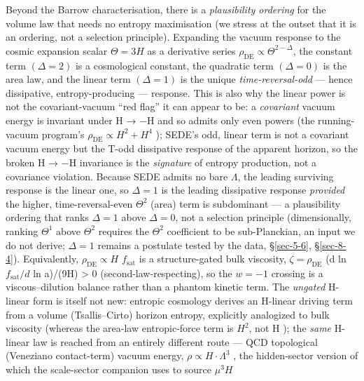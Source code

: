 \documentclass[preprint,12pt]{elsarticle}
\begin{document}
Beyond the Barrow characterisation, there is a \emph{plausibility
ordering} for the volume law that needs no entropy maximisation (we
stress at the outset that it is an ordering, not a selection principle).
Expanding the vacuum response to the cosmic expansion scalar
\(\Theta  = 3H\) as a derivative series
\(\rho _\mathrm{DE} \propto  \Theta ^{2-\Delta }\), the constant term
\((\Delta =2)\) is a cosmological constant, the quadratic term
\((\Delta =0)\) is the area law, and the linear term \((\Delta =1)\) is
the unique \emph{time-reversal-odd} --- hence dissipative,
entropy-producing --- response. This is also why the linear power is not
the covariant-vacuum ``red flag'' it can appear to be: a
\emph{covariant} vacuum energy is invariant under H → −H and so admits
only even powers (the running-vacuum program's
\(\rho _\mathrm{DE} \propto  H^{2} + H^{4}\) \citep{Basilakos:2012ra});
SEDE's odd, linear term is not a covariant vacuum energy but the T-odd
dissipative response of the apparent horizon, so the broken H → −H
invariance is the \emph{signature} of entropy production, not a
covariance violation. Because SEDE admits no bare \(\Lambda\), the
leading surviving response is the linear one, so \(\Delta =1\) is the
leading dissipative response \emph{provided} the higher,
time-reversal-even \(\Theta ^{2}\) (area) term is subdominant --- a
plausibility ordering that ranks \(\Delta =1\) above \(\Delta =0\), not
a selection principle (dimensionally, ranking \(\Theta ^{1}\) above
\(\Theta ^{2}\) requires the \(\Theta ^{2}\) coefficient to be
sub-Planckian, an input we do not derive; \(\Delta =1\) remains a
postulate tested by the data, §\ref{sec-5-6}, §\ref{sec-8-4}).
Equivalently, \(\rho _\mathrm{DE} \propto  H\) \(f_{\mathrm{sat}}\) is a
structure-gated bulk viscosity, \(\zeta  = \rho _\mathrm{DE}\) (d ln
\(f_{\mathrm{sat}}/d\) ln a)/(9H) \textgreater{} 0
(second-law-respecting), so the \(w = -1\) crossing is a
viscous--dilution balance rather than a phantom kinetic term. The
\emph{ungated} H-linear form is itself not new: entropic cosmology
derives an H-linear driving term from a volume (Tsallis--Cirto) horizon
entropy, explicitly analogized to bulk viscosity
\citep{Komatsu:2015nkb, Komatsu:2012zh} (whereas the area-law
entropic-force term is \(H^{2}\), not H
\citep{Easson:2010av, Basilakos:2012ra}); the \emph{same} H-linear law
is reached from an entirely different route --- QCD topological
(Veneziano contact-term) vacuum energy,
\(\rho  \propto  H\cdot \Lambda ^{3}\)
\citep{Urban:2009vy, Urban:2009yg, Ohta:2010in}, the hidden-sector
version of which the scale-sector companion uses to source \(\mu ^{3}H\)
\end{document}
